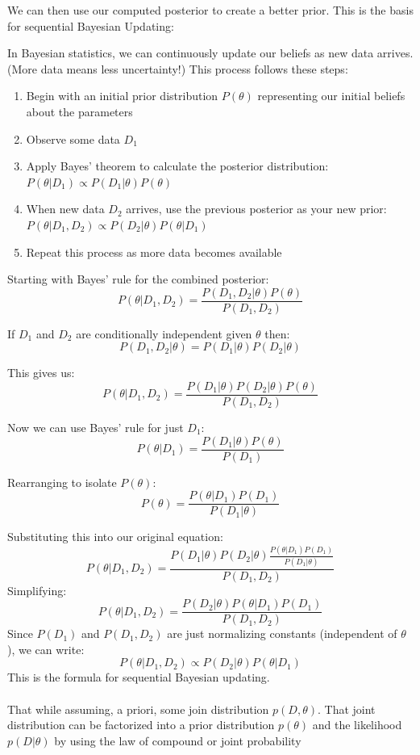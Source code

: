We can then use our computed posterior to create a better prior.
This is the basis for sequential Bayesian Updating:

In Bayesian statistics, we can continuously update our beliefs as new data arrives.
(More data means less uncertainty!)
This process follows these steps:

\begin{enumerate}
\item Begin with an initial prior distribution $P(\theta)$ representing our initial beliefs about the
    parameters
\item Observe some data $D_{1}$
\item Apply Bayes' theorem to calculate the posterior distribution:
    $P(\theta|D_{1}) \propto P(D_{1}|\theta) P(\theta)$
\item When new data $D_{2}$ arrives, use the previous posterior as your new prior:
    $P(\theta|D_{1}, D_{2}) \propto P(D_{2}|\theta) P(\theta|D_{1})$
\item Repeat this process as more data becomes available
\end{enumerate}


Starting with Bayes' rule for the combined posterior:
$$
P(\theta|D_1,D_2) = \frac{P(D_1,D_2|\theta)P(\theta)}{P(D_1,D_2)}
$$


If $D_1$ and $D_2$ are conditionally independent given $\theta$ then:
$$
P(D_1,D_2|\theta) = P(D_1|\theta)P(D_2|\theta)
$$

This gives us:
$$
P(\theta|D_1,D_2) = \frac{P(D_1|\theta)P(D_2|\theta)P(\theta)}{P(D_1,D_2)}
$$

Now we can use Bayes' rule for just $D_1$:
$$
P(\theta|D_1) = \frac{P(D_1|\theta)P(\theta)}{P(D_1)}
$$

Rearranging to isolate $P(\theta)$:
$$
P(\theta) = \frac{P(\theta|D_1)P(D_1)}{P(D_1|\theta)}
$$

Substituting this into our original equation:
$$
P(\theta|D_1,D_2) = \frac{P(D_1|\theta)P(D_2|\theta)\frac{P(\theta|D_1)P(D_1)}{P(D_1|\theta)}}{P(D_1,D_2)}
$$
Simplifying:
$$
P(\theta|D_1,D_2) = \frac{P(D_2|\theta)P(\theta|D_1)P(D_1)}{P(D_1,D_2)}
$$
Since $P(D_1)$ and $P(D_1,D_2)$ are just normalizing constants (independent of $\theta$),
we can write:
$$
P(\theta|D_1,D_2) \propto P(D_2|\theta)P(\theta|D_1)
$$
This is the formula for sequential Bayesian updating.
\\~\\

That while assuming, a priori, some join distribution $p(D, \theta)$.
That joint distribution can be factorized into a prior distribution $p(\theta)$ and the likelihood
$p(D|\theta)$ by using the law of compound or joint probability

